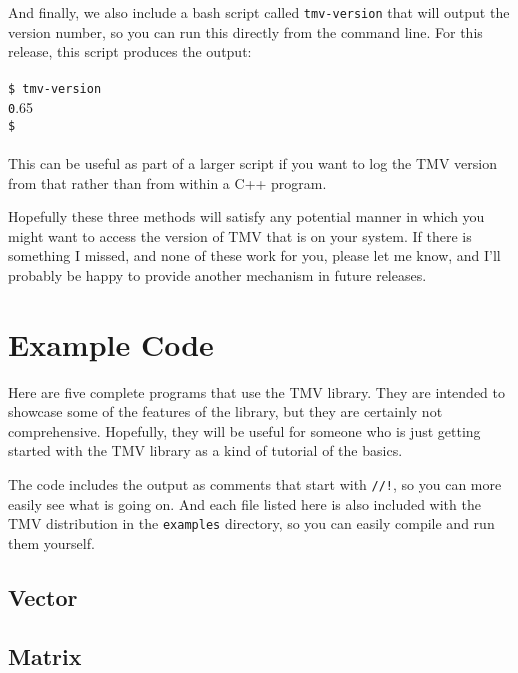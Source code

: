 \documentclass[twoside,letterpaper,11pt]{article}
\newcommand{\tmvversion}{0.65}
\newcommand{\tttmvversion}{\texttt \tmvversion}
\renewcommand{\tt}[1]{{\lstinline {#1}}}
\newcommand{\inputcode}[1]{}
\begin{document}
And finally, we also include a bash script called \tt{tmv-version} that will output
the version number, so you can run this
directly from the command line.  For this release, this script produces the output:\\ \\
\texttt{\$ tmv-version} \\
\tttmvversion \\
\texttt{\$}\\ \\
This can be useful as part of a larger script if you want to log the TMV version from that
rather than from within a C++ program.  

Hopefully these three methods will satisfy any potential manner in which you might want 
to access the version of TMV that is on your system.  If there is something I missed, and 
none of these work for you, please
let me know, and I'll probably be happy to provide another mechanism in future releases.


\newpage
\section{Example Code}

Here are five complete programs that use the TMV library.  They are intended to showcase
some of the features of the library, but they are certainly not comprehensive.  Hopefully,
they will be useful for someone who is just getting started with the TMV library as a 
kind of tutorial of the basics.


The code includes the output as comments that start with \lstinline{//!}, so you can more easily see what is going on.
And each file listed here is also included with the TMV distribution in the \texttt{examples}
directory, so you can easily compile and run them yourself.

\newpage
\subsection{Vector}

\inputcode{../examples/Vector.cpp}
%
%
\vspace{12pt}

\newpage
\subsection{Matrix}
\end{document}

